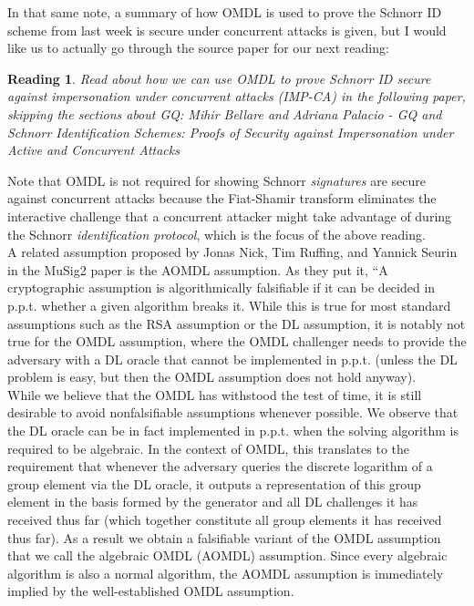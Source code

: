 \documentclass[12pt]{article}
\newtheorem{reading}{Reading}
\theoremstyle{definition}
\theoremstyle{remark}
\theoremstyle{definition}
\begin{document}
In that same note, a summary of how OMDL is used to prove the Schnorr ID scheme from last week is secure under concurrent attacks is given, but I would like us to actually go through the source paper for our next reading:

\begin{reading}
Read about how we can use OMDL to prove Schnorr ID secure against impersonation under concurrent attacks (IMP-CA) in the following paper, skipping the sections about GQ:
Mihir Bellare and Adriana Palacio - GQ and Schnorr Identification Schemes: Proofs of Security against Impersonation under Active and Concurrent Attacks
\end{reading}

Note that OMDL is not required for showing Schnorr \emph{signatures} are secure against concurrent attacks because the Fiat-Shamir transform eliminates the interactive challenge that a concurrent attacker might take advantage of during the Schnorr \emph{identification protocol}, which is the focus of the above reading.\\

A related assumption proposed by Jonas Nick, Tim Ruffing, and Yannick Seurin in the MuSig2 paper is the AOMDL assumption. As they put it, ``A cryptographic assumption is algorithmically falsifiable if it can be decided in p.p.t. whether a given algorithm breaks it. While this is true for most standard assumptions such as the RSA assumption or the DL assumption, it is notably not true for the OMDL assumption, where the OMDL challenger needs to provide the adversary with a DL oracle that cannot be implemented in p.p.t. (unless the DL problem is easy, but then the OMDL assumption does not hold anyway).\\

While we believe that the OMDL has withstood the test of time, it is still desirable to avoid nonfalsifiable assumptions whenever possible. We observe that the DL oracle can be in fact implemented in p.p.t. when the solving algorithm is required to be algebraic. In the context of OMDL, this translates to the requirement that whenever the adversary queries the discrete logarithm of a group element via the DL oracle, it outputs a representation of this group element in the basis formed by the generator and all DL challenges it has received thus far (which together constitute all group elements it has received thus far). As a result we obtain a falsifiable variant of the OMDL assumption that we call the algebraic OMDL (AOMDL) assumption. Since every algebraic algorithm is also a normal algorithm, the AOMDL assumption is immediately implied by the well-established OMDL assumption.\\
\end{document}
